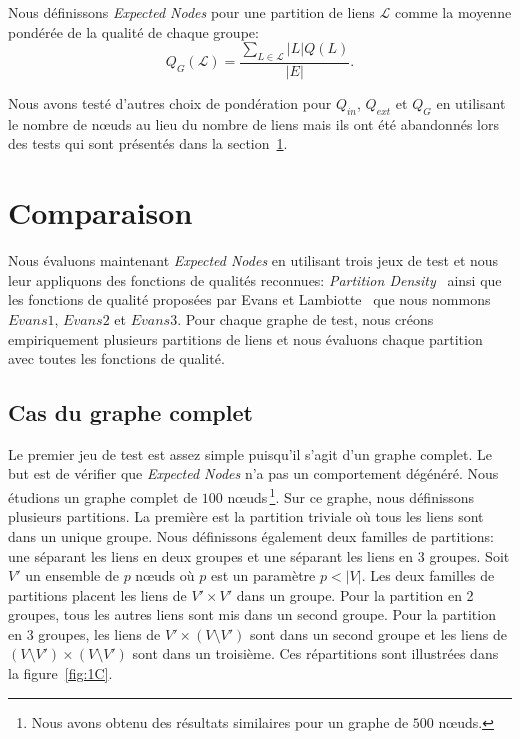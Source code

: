 Nous définissons \emph{Expected Nodes} pour une partition de liens $\mathcal{L}$ comme la moyenne pondérée de la qualité de chaque groupe:
\begin{equation}
\label{eq:qualite_globale} Q_G(\mathcal{L}) = \dfrac{\sum_{L\in \mathcal{L}} |L|Q(L)}{|E|}.
\end{equation}

Nous avons testé d'autres choix de pondération pour $Q_{in}$, $Q_{ext}$ et $Q_G$ en utilisant le nombre de n\oe{}uds au lieu du nombre de liens mais ils ont été abandonnés lors des tests qui sont présentés dans la section~\ref{sec:expected_comp}.

\section{Comparaison}
\label{sec:expected_comp}
Nous évaluons maintenant \emph{Expected Nodes} en utilisant trois jeux de test et nous leur appliquons des fonctions de qualités reconnues:
\emph{Partition Density}~\cite{Ahn2010a} ainsi que les fonctions de qualité proposées par Evans et Lambiotte~\cite{Evans2009} que nous nommons $Evans1$, $Evans2$ et $Evans3$.
Pour chaque graphe de test, nous créons empiriquement plusieurs partitions de liens et nous évaluons chaque partition avec toutes les fonctions de qualité.

\subsection{Cas du graphe complet}
\label{Completegraph}
Le premier jeu de test est assez simple puisqu'il s'agit d'un graphe complet.
Le but est de vérifier que \emph{Expected Nodes} n'a pas un comportement dégénéré.
Nous étudions un graphe complet de $100$ n\oe{}uds\,\footnote{Nous avons obtenu des résultats similaires pour un graphe de $500$ n\oe{}uds.}.
Sur ce graphe, nous définissons plusieurs partitions.
La première est la partition triviale où tous les liens sont dans un unique groupe.
Nous définissons également deux familles de partitions: une séparant les liens en deux groupes et une séparant les liens en 3 groupes.
Soit $V'$ un ensemble de $p$ n\oe{}uds où $p$ est un paramètre $p<|V|$.
Les deux familles de partitions placent les liens de $V' \times V'$ dans un groupe.
Pour la partition en 2 groupes, tous les autres liens sont mis dans un second groupe.
Pour la partition en 3 groupes, les liens de $V' \times (V\setminus V')$ sont dans un second groupe et les liens de $(V \setminus V') \times (V\setminus V')$ sont dans un troisième.
Ces répartitions sont illustrées dans la figure~\ref{fig:1C}.

